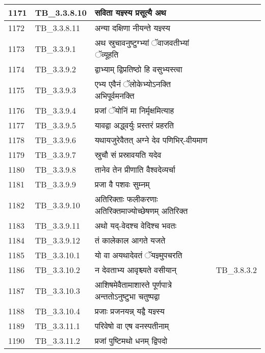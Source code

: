 \documentclass[17pt]{extarticle}
\begin{document}
\begin{longtable}{||p{0.4in}||p{0.9in}||p{4.0in}||p{0.9in}||}
        \hline
            1171 & TB\_3.3.8.10 & सविता यज्ञ्स्य प्रसूत्यै अथ &      \\
        \hline
            1172 & TB\_3.3.8.11 & अन्या दक्षिणा नीयन्ते यज्ञ्स्य &      \\
        \hline
            1173 & TB\_3.3.9.1 & अथ स्रुचावनुष्टुग्भ्यां ॅवाजवतीभ्यां ॅव्यूहति &      \\
        \hline
            1174 & TB\_3.3.9.2 & द्वाभ्याम् द्विप्रतिष्ठो हि वसुभ्यस्त्वा &      \\
        \hline
            1175 & TB\_3.3.9.3 & एभ्य एवैनं ॅलोकेभ्योऽनक्ति अभिपूर्वमनक्ति &      \\
        \hline
            1176 & TB\_3.3.9.4 & प्रजां ॅयोनिं मा निर्मृक्षमित्याह &      \\
        \hline
            1177 & TB\_3.3.9.5 & यावद्वा अद्ध्वर्युः प्रस्तरं प्रहरति &      \\
        \hline
            1178 & TB\_3.3.9.6 & यथायजुरेवैतत् अग्ने देव पणिभिर्{-}वीयमाण &      \\
        \hline
            1179 & TB\_3.3.9.7 & स्रुचौ सं प्रस्रावयति यदेव &      \\
        \hline
            1180 & TB\_3.3.9.8 & तानेव तेन प्रीणाति वैश्वदेव्यर्चा &      \\
        \hline
            1181 & TB\_3.3.9.9 & प्रजा वै पशवः सुम्नम् &      \\
        \hline
            1182 & TB\_3.3.9.10 & अतिरिक्ताः फलीकरणाः अतिरिक्तमाज्योच्छेषणम् अतिरिक्त &      \\
        \hline
            1183 & TB\_3.3.9.11 & अथो यद्{-}वेदश्च वेदिश्च भवतः &      \\
        \hline
            1184 & TB\_3.3.9.12 & तं कालेकाल आगते यजते &      \\
        \hline
            1185 & TB\_3.3.10.1 & यो वा अयथादेवतं ॅयज्ञ्मुपचरति &      \\
        \hline
            1186 & TB\_3.3.10.2 & न देवताभ्य आवृश्च्यते वसीयान् &  TB\_3.8.3.2       \\
        \hline
            1187 & TB\_3.3.10.3 & आशिषमेवैतामाशास्ते पूर्णपात्रे अन्ततोऽनुष्टुभा चतुष्पद्वा &      \\
        \hline
            1188 & TB\_3.3.10.4 & प्रजाः प्रजनयन्न् यद्वै यज्ञ्स्य &      \\
        \hline
            1189 & TB\_3.3.11.1 & परिवेषो वा एष वनस्पतीनाम् &      \\
        \hline
            1190 & TB\_3.3.11.2 & प्रजां पुष्टिमथो धनम् द्विपदो &      \\

\end{longtable}
\end{document}
